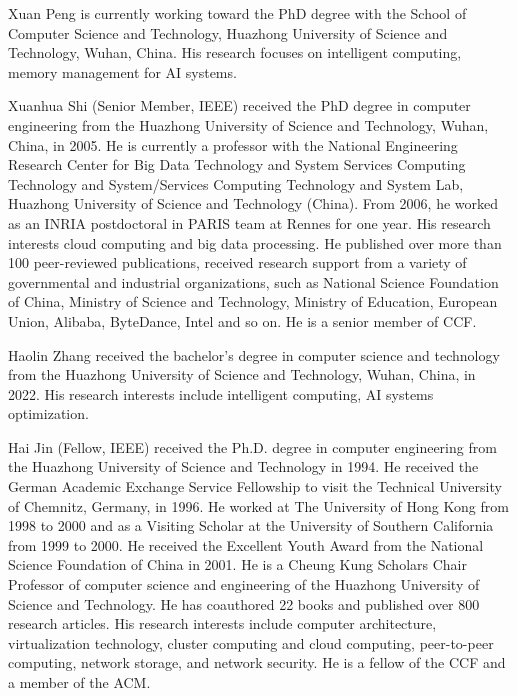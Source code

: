 \documentclass[journal,compsoc]{IEEEtran}
\begin{document}
\begin{IEEEbiography}{Xuan Peng}
is currently working toward the PhD degree with the School of Computer Science and Technology, Huazhong University of Science and Technology, Wuhan, China. His research focuses on intelligent computing, memory management for AI systems.
\end{IEEEbiography}
\vspace{-0.8cm}
\begin{IEEEbiography}{Xuanhua Shi}
(Senior Member, IEEE) received the PhD degree in computer engineering from the Huazhong University of Science and Technology, Wuhan, China, in 2005. He is currently a professor with the National Engineering Research Center for Big Data Technology and System Services Computing Technology and System/Services Computing Technology and System Lab, Huazhong University of Science and Technology (China). From 2006, he worked as an INRIA postdoctoral in PARIS team at Rennes for one year. His research interests cloud computing and big data processing. He published over more than 100 peer-reviewed publications, received research support from a variety of governmental and industrial organizations, such as National Science Foundation of China, Ministry of Science and Technology, Ministry of Education, European Union, Alibaba, ByteDance, Intel and so on. He is a senior member of CCF.
\end{IEEEbiography}
\vspace{-0.8cm}
\begin{IEEEbiography}{Haolin Zhang}
received the bachelor's degree in computer science and technology from the Huazhong University of Science and Technology, Wuhan, China, in 2022. His research interests include intelligent computing, AI systems optimization.
\end{IEEEbiography}
\vspace{-0.8cm}
\begin{IEEEbiography}{Hai Jin}
(Fellow, IEEE) received the Ph.D. degree in computer engineering from the Huazhong University of Science and Technology in 1994. He received the German Academic Exchange Service Fellowship to visit the Technical University of Chemnitz, Germany, in 1996. He worked at The University of Hong Kong from 1998 to 2000 and as a Visiting Scholar at the University of Southern California from 1999 to 2000. He received the Excellent Youth Award from the National Science Foundation of China in 2001. He is a Cheung Kung Scholars Chair Professor of computer science and engineering of the Huazhong University of Science and Technology. He has coauthored 22 books and published over 800 research articles. His research interests include computer architecture, virtualization technology, cluster computing and cloud computing, peer-to-peer computing, network storage, and network security. He is a fellow of the CCF and a member of the ACM.
\end{IEEEbiography}
\end{document}

